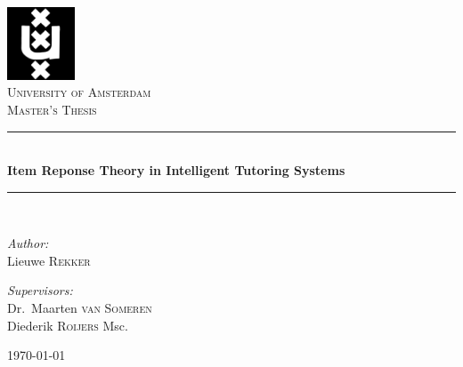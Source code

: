 \begin{titlepage}
\begin{center}

\newcommand{\HRule}{\rule{\linewidth}{0.5mm}}
\includegraphics[width=0.15\textwidth]{images/uva-logo.png}~\\[1cm]

\textsc{University of Amsterdam}\\[1.5cm]

\textsc{\Large Master's Thesis}\\[0.5cm]

\HRule  \\[0.4cm]
{ \huge \bfseries Item Reponse Theory in Intelligent Tutoring Systems \\[0.4cm] }

\HRule  \\[1.5cm]

\noindent
\begin{minipage}{0.4\textwidth}
\begin{flushleft} \large
\emph{Author:}\\
Lieuwe \textsc{Rekker}
\end{flushleft}
\end{minipage}%
\begin{minipage}{0.4\textwidth}
\begin{flushright} \large
\emph{Supervisors:} \\
Dr.~Maarten \textsc{van Someren}\\
Diederik \textsc{Roijers} Msc.
\end{flushright}
\end{minipage}

\vfill

{\large \today}

\end{center}
\end{titlepage}